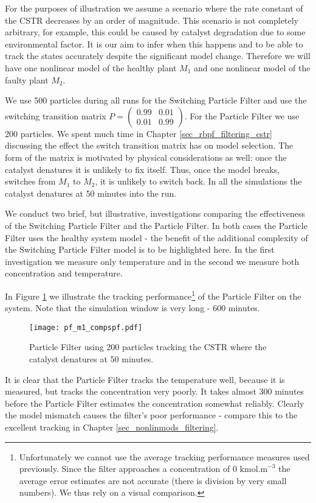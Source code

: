For the purposes of illustration we assume a scenario where the rate constant of the CSTR decreases by an order of magnitude. This scenario is not completely arbitrary, for example, this could be caused by catalyst degradation due to some environmental factor. It is our aim to infer when this happens and to be able to track the states accurately despite the significant model change. Therefore we will have one nonlinear model of the healthy plant $M_1$ and one nonlinear model of the faulty plant $M_2$. 

We use 500 particles during all runs for the Switching Particle Filter and use the switching transition matrix $P=\begin{pmatrix}
0.99 & 0.01 \\ 0.01 & 0.99
\end{pmatrix}$. For the Particle Filter we use 200 particles. We spent much time in Chapter \ref{sec_rbpf_filtering_cstr} discussing the effect the switch transition matrix has on model selection. The form of the matrix is motivated by physical considerations as well: once the catalyst denatures it is unlikely to fix itself. Thus, once the model breaks, switches from $M_1$ to $M_2$, it is unlikely to switch back. In all the simulations the catalyst denatures at 50 minutes into the run.

We conduct two brief, but illustrative, investigations comparing the effectiveness of the Switching Particle Filter and the Particle Filter. In both cases the Particle Filter uses the healthy system model - the benefit of the additional complexity of the Switching Particle Filter model is to be highlighted here. In the first investigation we measure only temperature and in the second we measure both concentration and temperature. 

In Figure \ref{fig_pf_m1_compspf} we illustrate the tracking performance\footnote{Unfortunately we cannot use the average tracking performance measures used previously. Since the filter approaches a concentration of 0 $\text{kmol.m}^{-3}$ the average error estimates are not accurate (there is division by very small numbers). We thus rely on a visual comparison.} of the Particle Filter on the system. Note that the simulation window is very long - 600 minutes.
\begin{figure}[H] 
\centering
\texttt{[image: pf\_m1\_compspf.pdf]}
\caption{Particle Filter using 200 particles tracking the CSTR where the catalyst denatures at 50 minutes.}
\label{fig_pf_m1_compspf}
\end{figure}
It is clear that the Particle Filter tracks the temperature well, because it is measured, but tracks the concentration very poorly. It takes almost 300 minutes before the Particle Filter estimates the concentration somewhat reliably. Clearly the model mismatch causes the filter's poor performance - compare this to the excellent tracking in Chapter \ref{sec_nonlinmods_filtering}.

